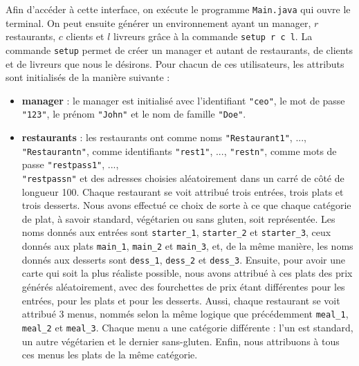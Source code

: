 Afin d'accéder à cette interface, on exécute le programme \texttt{Main.java} qui ouvre le terminal. On peut ensuite générer un environnement ayant un manager, $r$ restaurants, $c$ clients et $l$ livreurs grâce à la commande \texttt{setup r c l}. La commande \texttt{setup} permet de créer un manager et autant de restaurants, de clients et de livreurs que nous le désirons. Pour chacun de ces utilisateurs, les attributs sont initialisés de la manière suivante :
\begin{itemize}
    \item \textbf{manager} : le manager est initialisé avec l'identifiant \texttt{"ceo"}, le mot de passe \texttt{"123"}, le prénom \texttt{"John"} et le nom de famille \texttt{"Doe"}. \\
    \item \textbf{restaurants} : les restaurants ont comme noms \texttt{"Restaurant1"}, ..., \texttt{"Restaurantn"}, comme identifiants \texttt{"rest1"}, ..., \texttt{"restn"}, comme mots de passe \texttt{"restpass1"}, ...,\\ \texttt{"restpassn"} et des adresses choisies aléatoirement dans un carré de côté de longueur 100. Chaque restaurant se voit attribué trois entrées, trois plats et trois desserts. Nous avons effectué ce choix de sorte à ce que chaque catégorie de plat, à savoir standard, végétarien ou sans gluten, soit représentée. Les noms donnés aux entrées sont \texttt{starter\_1}, \texttt{starter\_2} et \texttt{starter\_3}, ceux donnés aux plats \texttt{main\_1}, \texttt{main\_2} et \texttt{main\_3}, et, de la même manière, les noms donnés aux desserts sont \texttt{dess\_1}, \texttt{dess\_2} et \texttt{dess\_3}. Ensuite, pour avoir une carte qui soit la plus réaliste possible, nous avons attribué à ces plats des prix générés aléatoirement, avec des fourchettes de prix étant différentes pour les entrées, pour les plats et pour les desserts. Aussi, chaque restaurant se voit attribué 3 menus, nommés selon la même logique que précédemment \texttt{meal\_1}, \texttt{meal\_2} et \texttt{meal\_3}. Chaque menu a une catégorie différente : l'un est standard, un autre végétarien et le dernier sans-gluten. Enfin, nous attribuons à tous ces menus les plats de la même catégorie. \\

\end{itemize}
